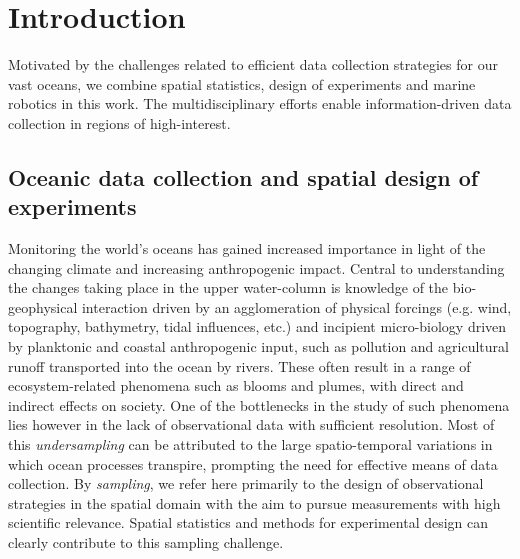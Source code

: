 \documentclass[aoas]{imsart}
\begin{document}
\section{Introduction}


Motivated by the challenges related to efficient data collection
strategies for our vast oceans, we combine spatial statistics, design
of experiments and marine robotics in this work.  The
multidisciplinary efforts enable information-driven data collection in
regions of high-interest.


\subsection{Oceanic data collection and spatial design of experiments}


Monitoring the world's oceans has gained increased importance in light
of the changing climate and increasing anthropogenic impact. Central
to understanding the changes taking place in the upper water-column is
knowledge of the bio-geophysical interaction driven by an
agglomeration of physical forcings (e.g. wind, topography, bathymetry,
tidal influences, etc.) and incipient micro-biology driven by
planktonic and coastal anthropogenic input, such as pollution and
agricultural runoff transported into the ocean by rivers.  These often
result in a range of ecosystem-related phenomena such as blooms and
plumes, with direct and indirect effects on society.  One of the
bottlenecks in the study of such phenomena lies however in the lack of
observational data with sufficient resolution. Most of this
\emph{undersampling} can be attributed to the large spatio-temporal
variations in which ocean processes transpire, prompting the need for
effective means of data collection.  By \emph{sampling}, we refer here
primarily to the design of observational strategies in the spatial
domain with the aim to pursue measurements with high scientific
relevance.  Spatial statistics and methods for experimental design can
clearly contribute to this sampling challenge.

 
\end{document}

